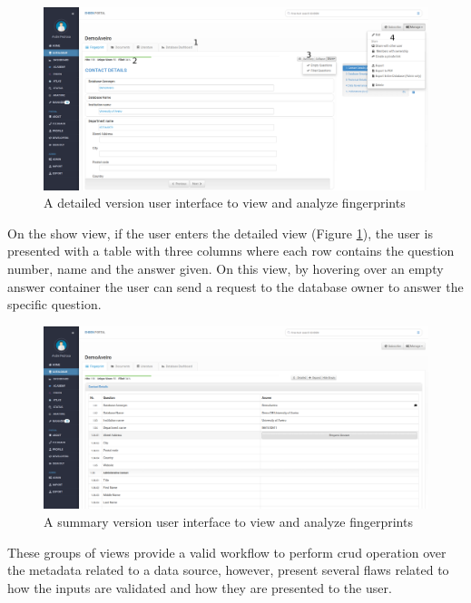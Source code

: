 \begin{figure}[h]
    \center
    \includegraphics[width=\textwidth]{fingerprint-show-detailed}
    \caption{A detailed version user interface to view and analyze fingerprints}
    \label{fig:fingerprint-show-detailed}
\end{figure}

On the show view, if the user enters the detailed view (Figure \ref{fig:fingerprint-show-detailed}), the user is presented with a table with three columns where each row contains the question number, name and the answer given.
On this view, by hovering over an empty answer container the user can send a request to the database owner to answer the specific question.

\begin{figure}[h]
    \center
    \includegraphics[width=\textwidth]{fingerprint-show-summary}
    \caption{A summary version user interface to view and analyze fingerprints}
    \label{fig:fingerprint-show-summary}
\end{figure}


These groups of views provide a valid workflow to perform \gls{crud} operation over the metadata related to a data source, however, present several flaws related to how the inputs are validated and how they are presented to the user.

